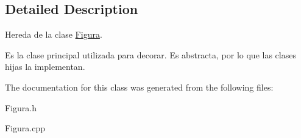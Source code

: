 \subsection{Detailed Description}
Hereda de la clase \hyperlink{class_figura}{Figura}. 

Es la clase principal utilizada para decorar. Es abstracta, por lo que las clases hijas la implementan. 

The documentation for this class was generated from the following files\-:\begin{DoxyCompactItemize}
\item 
Figura.\-h\item 
Figura.\-cpp\end{DoxyCompactItemize}
